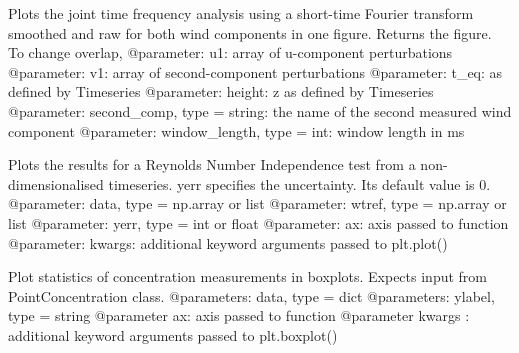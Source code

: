 \documentclass[letterpaper,10pt,english]{sphinxmanual}
\begin{document}
\begin{fulllineitems}
\label{\detokenize{index:windtunnel.plot_JTFA_STFT}}
Plots the joint time frequency analysis using a short-time Fourier
transform smoothed and raw for both wind components in one figure. Returns
the figure. To change overlap, 
@parameter: u1: array of u-component perturbations
@parameter: v1: array of second-component perturbations
@parameter: t\_eq: as defined by Timeseries
@parameter: height: z as defined by Timeseries
@parameter: second\_comp, type = string: the name of the second measured wind component
@parameter: window\_length, type = int: window length in ms

\end{fulllineitems}


\begin{fulllineitems}
\label{\detokenize{index:windtunnel.plot_Re_independence}}
Plots the results for a Reynolds Number Independence test from a non-
dimensionalised timeseries. yerr specifies the uncertainty. Its default 
value is 0.
@parameter: data, type = np.array or list
@parameter: wtref, type = np.array or list
@parameter: yerr, type = int or float
@parameter: ax: axis passed to function
@parameter: kwargs: additional keyword arguments passed to plt.plot()

\end{fulllineitems}


\begin{fulllineitems}
\label{\detokenize{index:windtunnel.plot_boxplots}}
Plot statistics of concentration measurements in boxplots. Expects
input from PointConcentration class.
@parameters: data, type = dict
@parameters: ylabel, type = string
@parameter ax: axis passed to function
@parameter kwargs : additional keyword arguments passed to plt.boxplot()

\end{fulllineitems}
\end{document}
